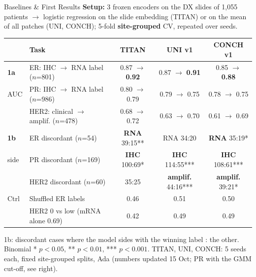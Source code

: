 \documentclass[aspectratio=169,10pt]{beamer}
\begin{document}
\begin{frame}[t]{Baselines \& First Results}
\footnotesize
\textbf{Setup:} 3 frozen encoders on the DX slides of 1,055 patients $\rightarrow$ logistic regression on the slide
embedding (TITAN) or on the mean of all patches (UNI, CONCH); 5-fold \textbf{site-grouped} CV, repeated over seeds.
\vspace{3pt}

\centering
\scriptsize
\begin{tabular}{llccc}
\toprule
 & Task & TITAN & UNI v1 & CONCH v1 \\
\midrule
\textbf{1a} & ER: IHC $\rightarrow$ RNA label ($n$=801) & 0.87 $\rightarrow$ \textbf{0.92} & 0.87 $\rightarrow$ \textbf{0.91} & 0.85 $\rightarrow$ \textbf{0.88} \\
AUC & PR: IHC $\rightarrow$ RNA label ($n$=986) & 0.80 $\rightarrow$ 0.79 & 0.79 $\rightarrow$ 0.75 & 0.78 $\rightarrow$ 0.75 \\
 & HER2: clinical $\rightarrow$ amplif. ($n$=478) & 0.68 $\rightarrow$ 0.72 & 0.63 $\rightarrow$ 0.70 & 0.61 $\rightarrow$ 0.69 \\
\midrule
\textbf{1b} & ER discordant ($n$=54) & \textbf{RNA} 39:15** & RNA 34:20 & \textbf{RNA} 35:19* \\
side & PR discordant ($n$=169) & \textbf{IHC} 100:69* & \textbf{IHC} 114:55*** & \textbf{IHC} 108:61*** \\
 & HER2 discordant ($n$=60) & 35:25 & \textbf{amplif.} 44:16*** & \textbf{amplif.} 39:21* \\
\midrule
Ctrl & Shuffled ER labels & 0.46 & 0.51 & 0.50 \\
 & HER2 0 vs low (mRNA alone 0.69) & 0.42 & 0.49 & 0.49 \\
\bottomrule
\end{tabular}

\vspace{1pt}
{\tiny 1b: discordant cases where the model sides with the winning label : the other. Binomial * $p<0.05$, ** $p<0.01$, *** $p<0.001$.
TITAN, UNI, CONCH: 5 seeds each, fixed site-grouped splits, Ada (numbers updated 15 Oct; PR with the GMM cut-off, see right).}


\end{frame}
\end{document}
